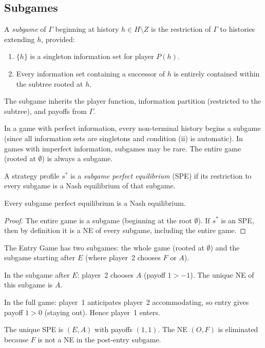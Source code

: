 \documentclass[11pt,a4paper]{article}
\begin{document}
\subsection{Subgames}
\label{subsec:subgame_def}

\begin{definition}[Subgame]
\label{def:subgame}
A \emph{subgame} of $\Gamma$ beginning at history $h \in H \setminus Z$ is
the restriction of $\Gamma$ to histories extending $h$, provided:
\begin{enumerate}[nosep,label=(\roman*)]
    \item $\{h\}$ is a singleton information set for player $P(h)$.
    \item Every information set containing a successor of $h$ is entirely
    contained within the subtree rooted at $h$.
\end{enumerate}
The subgame inherits the player function, information partition (restricted
to the subtree), and payoffs from $\Gamma$.
\end{definition}

\begin{remark}
\label{rem:subgame_count}
In a game with perfect information, every non-terminal history begins a
subgame (since all information sets are singletons and condition (ii) is
automatic). In games with imperfect information, subgames may be rare. The
entire game (rooted at $\emptyset$) is always a subgame.
\end{remark}

\begin{definition}
\label{def:spe}
A strategy profile $s^*$ is a \emph{subgame perfect equilibrium} (SPE) if
its restriction to every subgame is a Nash equilibrium of that subgame.
\end{definition}

\begin{proposition}
\label{prop:spe_refines}
Every subgame perfect equilibrium is a Nash equilibrium.
\end{proposition}

\begin{proof}
The entire game is a subgame (beginning at the root $\emptyset$). If $s^*$
is an SPE, then by definition it is a NE of every subgame, including the
entire game.
\end{proof}

\begin{example}
\label{ex:spe_entry}
The Entry Game has two subgames: the whole game (rooted at $\emptyset$) and
the subgame starting after $E$ (where player~2 chooses $F$ or $A$).

In the subgame after $E$: player~2 chooses $A$ (payoff $1 > -1$). The unique
NE of this subgame is $A$.

In the full game: player~1 anticipates player~2 accommodating, so entry gives
payoff $1 > 0$ (staying out). Hence player~1 enters.

The unique SPE is $(E, A)$ with payoffs $(1, 1)$. The NE $(O, F)$ is
eliminated because $F$ is not a NE in the post-entry subgame.
\end{example}
\end{document}
